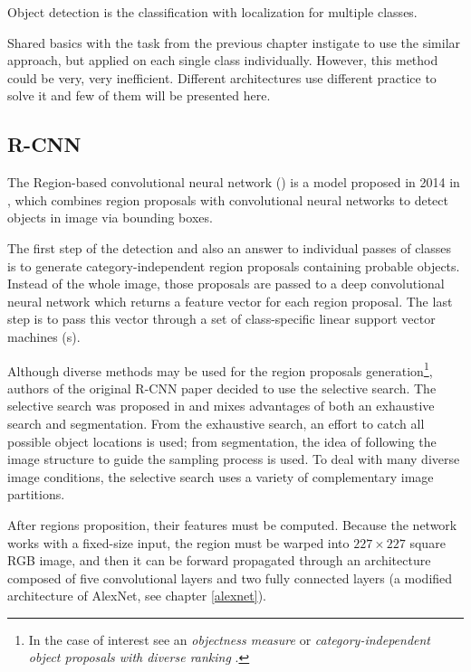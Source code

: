 Object detection is the classification with localization for multiple classes.

Shared basics with the task from the previous chapter instigate to use the similar approach, but applied on each single class individually. However, this method could be very, very inefficient. Different architectures use different practice to solve it and few of them will be presented here.

\subsection{R-CNN}
\label{r-cnn}

The Region-based convolutional neural network () is a model proposed in 2014 in \cite{rcnn}, which combines region proposals with convolutional neural networks to detect objects in image via bounding boxes. 

The first step of the detection and also an answer to individual passes of classes is to generate category-independent region proposals containing probable objects. Instead of the whole image, those proposals are passed to a deep convolutional neural network which returns a feature vector for each region proposal. The last step is to pass this vector through a set of class-specific linear support vector machines (s).

Although diverse methods may be used for the region proposals generation\footnote{In the case of interest see an \textit{objectness measure} \cite{objectness} or \textit{category-independent object proposals with diverse ranking} \cite{cat-independent-proposals}.}, authors of the original R-CNN paper decided to use the selective search. The selective search was proposed in \cite{selective-search} and mixes advantages of both an exhaustive search and segmentation. From the exhaustive search, an effort to catch all possible object locations is used; from segmentation, the idea of following the image structure to guide the sampling process is used. To deal with many diverse image conditions, the selective search uses a variety of complementary image partitions.

After regions proposition, their features must be computed. Because the network works with a fixed-size input, the region must be warped into $227 \times 227$ square RGB image, and then it can be forward propagated through an architecture composed of five convolutional layers and two fully connected layers (a modified architecture of AlexNet, see chapter \ref{alexnet}).

